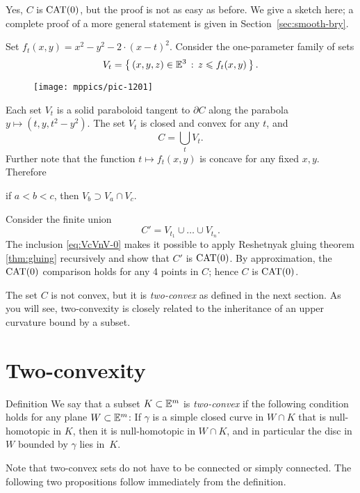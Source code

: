  Yes, $C$ is $\mathrm{CAT}(0)$, 
but the proof is not as easy as before.
We give a sketch here;
a complete proof of a more general statement is given in Section~\ref{sec:smooth-bry}.

Set $f_t(x,y)=x^2-y^2 -2\cdot (x-t)^2$.
Consider the one-parameter family of sets 
\[V_t=\left\{\,{(x,y,z)\in\mathbb{E}^3}\,:\,{z\leqslant f_t(x,y)}\,\right\}.\]


\begin{wrapfigure}{r}{25mm}
\vskip-10mm
\centering
\texttt{[image: mppics/pic-1201]}
\end{wrapfigure}

Each set $V_t$ is a solid paraboloid tangent to $\partial C$ along the parabola $y\mapsto(t,y,t^2-y^2)$.
The set $V_t$ is closed and convex for any $t$, and
\[C=\bigcup_t V_t.\]
Further note that the function $t\mapsto f_t(x,y)$ is concave for any fixed $x,y$.
Therefore
\begin{clm}{}\label{eq:VcVnV-0}
if $a<b<c$, then $V_b\supset V_a\cap V_c$.
\end{clm}

Consider the finite union
\[C'=V_{t_1}\cup\dots\cup V_{t_n}.\]
The inclusion \ref{eq:VcVnV-0} makes it possible to apply Reshetnyak gluing theorem \ref{thm:gluing} recursively and show that $C'$ is $\mathrm{CAT}(0)$.
By approximation, the $\mathrm{CAT}(0)$ comparison holds for any 4 points in $C$;
hence $C$ is $\mathrm{CAT}(0)$.

The set $C$ is not convex, but it is \emph{two-convex} as defined in the next section.
As you will see, two-convexity is closely related to the inheritance of an upper curvature bound by a subset.

\section{Two-convexity}

\begin{thm}{Definition}\label{def:two-convex}
We say that a subset $K\subset \mathbb{E}^m$ is \emph{two-convex}
if the following condition holds for any plane $W\subset\mathbb{E}^m$:
If $\gamma$ is a simple closed curve in $W\cap K$ 
that is null-homotopic in $K$,  
then it is null-homotopic in $W\cap K$, and  in particular the disc in $W$ bounded by $\gamma$ lies in~$K$.
\end{thm}

Note that two-convex sets do not have to be connected or simply connected. 
The following two propositions follow immediately from the definition.

